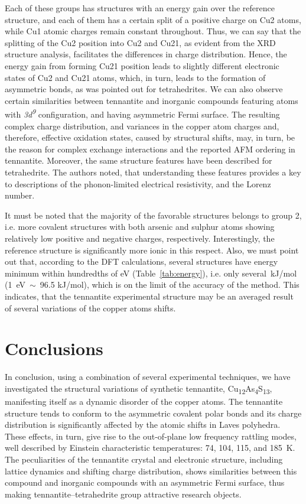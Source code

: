 \documentclass[preprint,review,12pt]{elsarticle}
\begin{document}
Each of these groups has structures with an energy gain over the reference structure, and each of them has a certain split of a positive charge on Cu2 atoms, while Cu1 atomic charges remain constant throughout.
Thus, we can say that the splitting of the Cu2 position into Cu2 and Cu21, as evident from the XRD structure analysis, facilitates the differences in charge distribution.
Hence, the energy gain from forming Cu21 position leads to slightly different electronic states of Cu2 and Cu21 atoms, which, in turn, leads to the formation of asymmetric bonds, as was pointed out for tetrahedrites\cite{Lai2015,Long2020}.
We can also observe certain similarities between tennantite and inorganic compounds featuring atoms with  {\it 3d\textsuperscript{9}}  configuration, and having asymmetric Fermi surface.
The resulting complex charge distribution, and variances in the copper atom charges and, therefore, effective oxidation states, caused by structural shifts, may, in turn, be the reason for complex exchange interactions and the reported AFM ordering\cite{yaroslavzev2019} in tennantite.
Moreover, the same structure features have been described for tetrahedrite\cite{DiPaola2020}.
The authors noted, that understanding these features provides a key to descriptions of the phonon-limited electrical resistivity, and the Lorenz number.

It must be noted that the majority of the favorable structures belongs to group 2, i.e. more covalent structures with both arsenic and sulphur atoms showing relatively low positive and negative charges, respectively.
Interestingly, the reference structure is significantly more ionic in this respect.
Also, we must point out that, according to the DFT calculations, several structures have energy minimum within hundredths of eV (Table~\ref{tab:energy}), i.e. only several~kJ/mol (1~eV~$\sim$~96.5 kJ/mol), which is on the limit of the accuracy of the method.
This indicates, that the tennantite experimental structure may be an averaged result of several variations of the copper atoms shifts.


\section{Conclusions}\label{sec:level1}
In conclusion, using a combination of several experimental techniques, we have investigated the structural variations of synthetic tennantite, Cu\textsubscript{12}As\textsubscript{4}S\textsubscript{13}, manifesting itself as a dynamic disorder of the copper atoms.
The tennantite structure tends to conform to the asymmetric covalent polar bonds and its charge distribution is significantly affected by the atomic shifts in Laves polyhedra.
These effects, in turn, give rise to the out-of-plane low frequency rattling modes, well described by Einstein characteristic temperatures: 74, 104, 115, and 185~K.
The peculiarities of the tennantite crystal and electronic structure, including lattice dynamics and shifting charge distribution, shows similarities between this compound and inorganic compounds with an asymmetric Fermi surface, thus making tennantite--tetrahedrite group attractive research objects.
\end{document}
